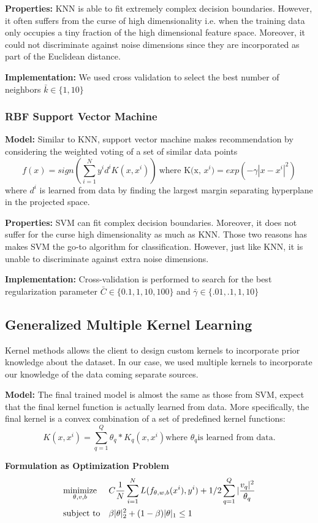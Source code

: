 \documentclass{article}
\begin{document}
\textbf{Properties:}
KNN is able to fit extremely complex decision boundaries. However, it often suffers from the curse of high dimensionality i.e. when the training data only occupies a tiny fraction of the high dimensional feature space. Moreover, it could not discriminate against noise dimensions since they are incorporated as part of the Euclidean distance.

\textbf{Implementation:}
We used cross validation to select the best number of neighbors $\bar{k} \in \{1, 10\}$

\subsubsection*{RBF Support Vector Machine}
\textbf{Model:}
Similar to KNN, support vector machine makes recommendation by considering the weighted voting of a set of similar data points
$$f(x) = sign(\sum_{i=1}^{N} y^i d^i K(x, x^i))\ \text{where K(x, $x^i$)} = exp(-\gamma|x - x^i|^2)$$
where $d^i$ is learned from data by finding the largest margin separating hyperplane in the projected space.

\textbf{Properties:}
SVM can fit complex decision boundaries. Moreover, it does not suffer for the curse high dimensionality as much as KNN. Those two reasons has makes SVM the go-to algorithm for classification. However, just like KNN, it is unable to discriminate against extra noise dimensions.

\textbf{Implementation:}
Cross-validation is performed to search for the best regularization parameter $\bar{C} \in \{0.1, 1, 10, 100\}$ and $\bar{\gamma} \in \{.01, .1, 1, 10\}$

\subsection*{Generalized Multiple Kernel Learning}
Kernel methods allows the client to design custom kernels to incorporate prior knowledge about the dataset. In our case, we used multiple kernels to incorporate our knowledge of the data coming separate sources.

\textbf{Model:}
The final trained model is almost the same as those from SVM, expect that the final kernel function is actually learned from data. More specifically, the final kernel is a convex combination of a set of predefined kernel functions: $$K(x, x^i) = \sum_{q=1}^{Q} \theta_q * K_q(x, x^i) \text{where }\theta_q \text{is learned from data}.$$

\textbf{Formulation as Optimization Problem}
\begin{align*}
&\text{$\underset{\theta, v, b}{\text{minimize}}$} & &C  \frac{1}{N} \sum_{i=1}^{N} L(f_{\theta, w, b}(x^i), y^i) + 1/2 \sum_{q=1}^{Q}|\frac{v_q|^2}{\theta_q} \\
&\text{subject to} & &\beta|\theta|_2^2 + (1-\beta){|\theta|_1} \leq 1
\end{align*}
\end{document}
